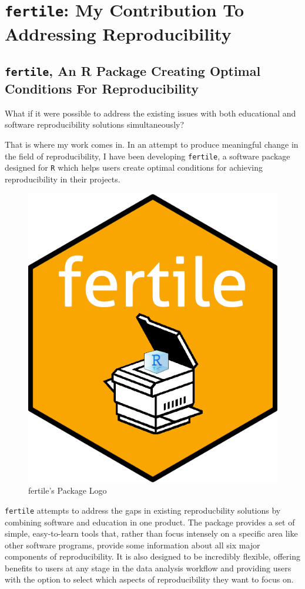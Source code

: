 \documentclass[12pt,twoside]{reedthesis}
\begin{document}
\chapter{\texorpdfstring{\texttt{fertile}: My Contribution To Addressing
Reproducibility}{fertile: My Contribution To Addressing Reproducibility}}\label{my-solution}

\section{\texorpdfstring{\texttt{fertile}, An R Package Creating Optimal
Conditions For
Reproducibility}{fertile, An R Package Creating Optimal Conditions For Reproducibility}}\label{fertile-an-r-package-creating-optimal-conditions-for-reproducibility}

What if it were possible to address the existing issues with both
educational and software reproducibility solutions simultaneously?

That is where my work comes in. In an attempt to produce meaningful
change in the field of reproducibility, I have been developing
\texttt{fertile}, a software package designed for \texttt{R} which helps
users create optimal conditions for achieving reproducibility in their
projects.
\begin{figure}

{\centering \includegraphics[width=0.3\linewidth]{figure/fertile-hex} 

}

\caption{fertile's Package Logo}\label{fig:unnamed-chunk-8}
\end{figure}
\texttt{fertile} attempts to address the gaps in existing reproducbility
solutions by combining software and education in one product. The
package provides a set of simple, easy-to-learn tools that, rather than
focus intensely on a specific area like other software programs, provide
some information about all six major components of reproducibility. It
is also designed to be incredibly flexible, offering benefits to users
at any stage in the data analysis workflow and providing users with the
option to select which aspects of reproducibility they want to focus on.
\end{document}
